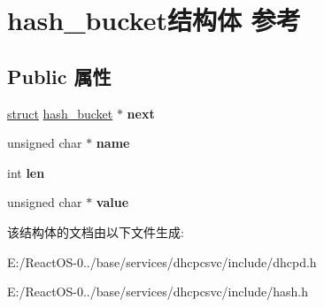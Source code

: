\hypertarget{structhash__bucket}{}\section{hash\+\_\+bucket结构体 参考}
\label{structhash__bucket}
\subsection*{Public 属性}
\begin{DoxyCompactItemize}
\item 
\mbox{\label{structhash__bucket_a3e7f45a78a0b5d2540bb500c4a4b2813}} 
\hyperlink{interfacestruct}{struct} \hyperlink{structhash__bucket}{hash\+\_\+bucket} $\ast$ {\bfseries next}
\item 
\mbox{\label{structhash__bucket_aabfd784bbe9cc16096553a2dc17d0110}} 
unsigned char $\ast$ {\bfseries name}
\item 
\mbox{\label{structhash__bucket_ac0161a19eda35a510a25576894cd39ba}} 
int {\bfseries len}
\item 
\mbox{\label{structhash__bucket_adcbd6841dd06608c6b64db7dd1350725}} 
unsigned char $\ast$ {\bfseries value}
\end{DoxyCompactItemize}


该结构体的文档由以下文件生成\+:\begin{DoxyCompactItemize}
\item 
E\+:/\+React\+O\+S-\/0../base/services/dhcpcsvc/include/dhcpd.\+h\item 
E\+:/\+React\+O\+S-\/0../base/services/dhcpcsvc/include/hash.\+h\end{DoxyCompactItemize}
